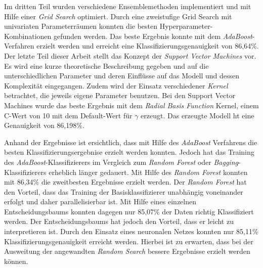\noindent \hspace*{7mm}
Im dritten Teil wurden verschiedene Ensemblemethoden implementiert und mit Hilfe einer \emph{Grid Search} optimiert. Durch eine zweistufige Grid Search mit univariaten Parameterräumen konnten die besten Hyperparameter-Kombinationen gefunden werden. Das beste Ergebnis konnte mit dem \emph{AdaBoost}-Verfahren erzielt werden und erreicht eine Klassifizierungsgenauigkeit von 86,64\%.\\
\noindent \hspace*{7mm}
Der letzte Teil dieser Arbeit stellt das Konzept der \emph{Support Vector Machines} vor. Es wird eine kurze theoretische Beschreibung gegeben und auf die unterschiedlichen Parameter und deren Einflüsse auf das Modell und dessen Komplexität eingegangen. Zudem wird der Einsatz verschiedener \emph{Kernel} betrachtet, die jeweils eigene Parameter benutzen. Bei den Support Vector Machines wurde das beste Ergebnis mit dem \emph{Radial Basis Function} Kernel, einem C-Wert von 10 mit dem Default-Wert für $\gamma$ erzeugt. Das erzeugte Modell ht eine Genauigkeit von 86,198\%.\\
\noindent \hspace*{7mm}

Anhand der Ergebnisse ist ersichtlich, dass mit Hilfe des  \emph{AdaBoost} Verfahrens die besten Klassifizierungsergebnise erzielt werden konnten. Jedoch hat das Training des  \emph{AdaBoost}-Klassifizierers im Vergleich zum  \emph{Random Forest} oder  \emph{Bagging}-Klassifizierers erheblich länger gedauert. Mit Hilfe des  \emph{Random Forest} konnten mit 86,34\% die zweitbesten Ergebnisse erzielt werden. Der  \emph{Random Forest} hat den Vorteil, dass das Training der Basisklassifizierer unabhängig voneinander erfolgt und daher parallelisierbar ist. Mit Hilfe eines einzelnen Entscheidungsbaums konnten dagegen nur 85,07\% der Daten richtig Klassifiziert werden. Der Entscheidungsbaums hat jedoch den Vorteil, dass er leicht zu interpretieren ist. Durch den Einsatz eines neuronalen Netzes konnten nur 85,11\% Klassifizierungsgenauigkeit erreicht werden. Hierbei ist zu erwarten, dass bei der Ausweitung der angewandten \emph{Random Search} bessere Ergebnisse erzielt werden können.    